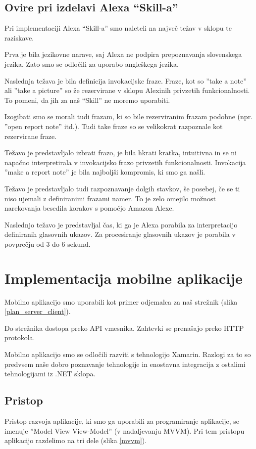 \documentclass[a4paper, 12pt]{book}
\begin{document}
\subsection{Ovire pri izdelavi Alexa \enquote{Skill-a}}

Pri implementaciji Alexa \enquote{Skill-a} smo naleteli na največ težav v sklopu te raziskave.

Prva je bila jezikovne narave, saj Alexa ne podpira prepoznavanja slovenskega jezika.
Zato smo se odločili za uporabo angleškega jezika.

Naslednja težava je bila definicija invokacijske fraze.
Fraze, kot so ''take a note'' ali ''take a picture'' so že rezervirane v sklopu Alexinih privzetih funkcionalnosti.
To pomeni, da jih za naš \enquote{Skill} ne moremo uporabiti.

Izogibati smo se morali tudi frazam, ki so bile rezerviranim frazam podobne (npr. ''open report note'' itd.).
Tudi take fraze so se velikokrat razpoznale kot rezervirane fraze.

Težavo je predstavljalo izbrati frazo, je bila hkrati kratka, intuitivna in se ni napačno interpretirala v invokacijsko frazo privzetih funkcionalnosti.
Invokacija ''make a report note'' je bila najboljši kompromis, ki smo ga našli.

Težavo je predstavljalo tudi razpoznavanje dolgih stavkov, še posebej, če se ti niso ujemali z definiranimi frazami namer.
To je zelo omejilo možnost narekovanja besedila korakov s pomočjo Amazon Alexe.

Naslednjo težavo je predstavljal čas, ki ga je Alexa porabila za interpretacijo definiranih glasovnih ukazov.
Za procesiranje glasovnih ukazov je porabila v povprečju od 3 do 6 sekund.

\section{Implementacija mobilne aplikacije}

Mobilno aplikacijo smo uporabili kot primer odjemalca za naš strežnik (slika \ref{plan_server_client}).

Do strežnika dostopa preko API vmesnika.
Zahtevki se prenašajo preko HTTP protokola.

Mobilno aplikacijo smo se odločili razviti s tehnologijo Xamarin.
Razlogi za to so predvsem naše dobro poznavanje tehnologije in enostavna integracija z ostalimi tehnologijami iz .NET sklopa.


\subsection{Pristop}
Pristop razvoja aplikacije, ki smo ga uporabili za programiranje aplikacije, se imenuje ''Model View View-Model'' (v nadaljevanju MVVM).
Pri tem pristopu aplikacijo razdelimo na tri dele (slika \ref{mvvm}).
\end{document}

